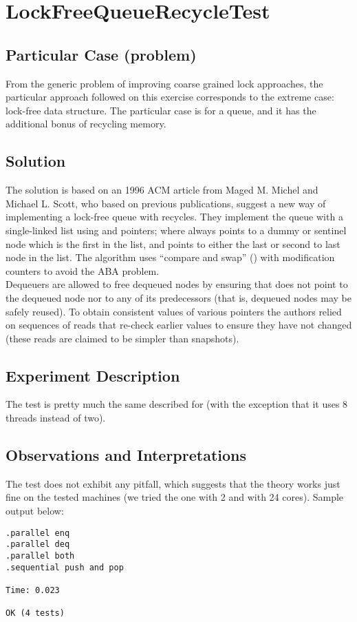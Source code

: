 \section{\textbf{LockFreeQueueRecycleTest}}

\subsection{Particular Case (problem)}
From the generic problem of improving coarse grained lock approaches,
the particular approach followed on this exercise corresponds to the
extreme case: lock-free data structure. The particular case is for a
queue, and it has the additional bonus of recycling memory.

\subsection{Solution}
The solution is based on an 1996 ACM article from Maged M. Michel and
Michael L. Scott, who based on previous publications, suggest a new
way of implementing a lock-free queue with recycles. They implement the
queue with a single-linked list using  and  pointers;
where  always points to a dummy or sentinel node which is the
first in the list, and  points to either the last or second to
last node in the list. The algorithm uses ``compare and swap''
() with modification counters to avoid the ABA problem. \\

Dequeuers are allowed to free dequeued nodes by ensuring that 
does not point to the dequeued node nor to any of its predecessors
(that is, dequeued nodes may be safely reused). To obtain consistent
values of various pointers the authors relied on sequences of reads
that re-check earlier values to ensure they have not changed (these
reads are claimed to be simpler than snapshots). 

\subsection{Experiment Description}
The test is pretty much the same described for 
(with the exception that it uses 8 threads instead of two).

\newpage
\subsection{Observations and Interpretations}
The test does not exhibit any pitfall, which suggests that the theory
works just fine on the tested machines (we tried the one with 2 and
with 24 cores). Sample output below:  

\begin{verbatim}
.parallel enq
.parallel deq
.parallel both
.sequential push and pop

Time: 0.023

OK (4 tests)
\end{verbatim}
\hfill

